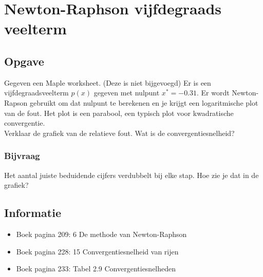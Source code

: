 \documentclass[examenvragen.tex]{subfiles}
\begin{document}
\section{Newton-Raphson vijfdegraads veelterm}
\subsection{Opgave}
Gegeven een Maple worksheet. (Deze is niet bijgevoegd) Er is een vijfdegraadsveelterm $p(x)$ gegeven met nulpunt $x^* = -0.31$. Er wordt Newton-Rapson gebruikt om dat nulpunt te berekenen en je krijgt een logaritmische plot van de fout. Het plot is een parabool, een typisch plot voor kwadratische convergentie.\\
Verklaar de grafiek van de relatieve fout. Wat is de convergentiesnelheid?
\subsubsection*{Bijvraag}
Het aantal juiste beduidende cijfers verdubbelt bij elke stap. Hoe zie je dat in de grafiek?
\subsection{Informatie}
\begin{itemize}
\item Boek pagina 209: 6 De methode van Newton-Raphson
\item Boek pagina 228: 15 Convergentiesnelheid van rijen
\item Boek pagina 233: Tabel 2.9 Convergentiesnelheden
\end{itemize}
\end{document}
